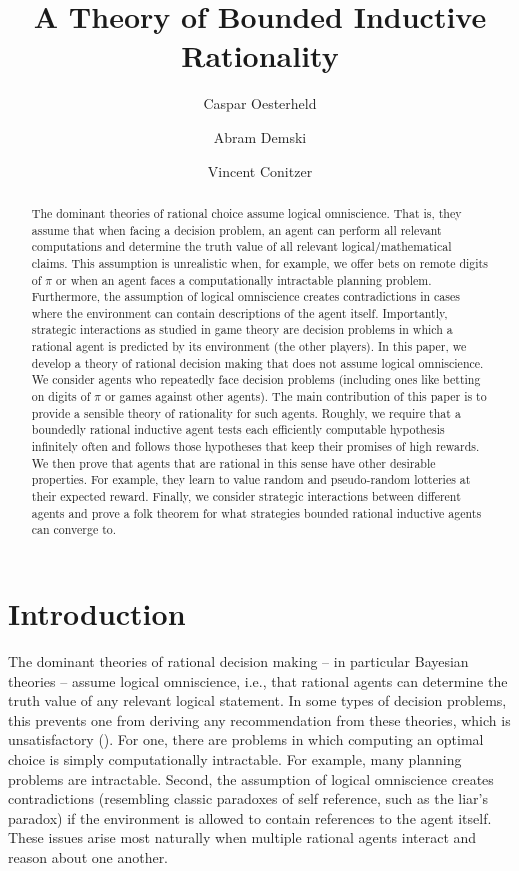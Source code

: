 \documentclass[submission,copyright,creativecommons]{eptcs}
\title{A Theory of Bounded Inductive Rationality}
\author{Caspar Oesterheld
\institute{Computer Science Department\\
Carnegie Mellon University\\
Pittsburgh, PA, USA}
\email{oesterheld@cmu.edu}
\and
Abram Demski
\institute{Machine Intelligence Research Institute\\
Berkeley, California, USA}
\and 
Vincent Conitzer
\institute{Computer Science Department\\
Carnegie Mellon University\\
Pittsburgh, PA, USA}
}
\begin{document}
\maketitle 

\begin{abstract}
The dominant theories of rational choice assume %
logical omniscience. That is, they assume that when facing a decision problem, an agent can perform all relevant computations and determine the truth value of all relevant logical/mathematical claims. This assumption is unrealistic when, for example, we offer bets on remote digits of $\pi$ or when an agent faces a computationally intractable planning problem.
Furthermore, the assumption of logical omniscience creates contradictions in cases where the environment can contain descriptions of the agent itself.
Importantly, strategic interactions as studied in game theory are decision problems in which a rational agent is predicted by its environment (the other players).
In this paper, we develop a theory of rational decision making that does not assume logical omniscience. 
We consider agents who repeatedly face decision problems (including ones like betting on digits of $\pi$ or games against other agents). The main contribution of this paper is to provide a sensible theory of rationality for such agents.
Roughly, we require that a boundedly rational inductive agent tests each efficiently computable hypothesis infinitely often and follows those hypotheses that keep their promises of high rewards. We then prove that agents that are rational in this sense have other desirable properties. For example, they learn to value random and pseudo-random lotteries at their expected reward. Finally, we consider strategic interactions between different agents and prove a folk theorem for what strategies bounded rational inductive agents can converge to.
\end{abstract}

%

\section{Introduction}
\label{sec:introduction}

The dominant theories of rational decision making -- in particular Bayesian theories -- assume logical omniscience, i.e., that rational agents can determine the truth value of any relevant logical statement. In some types of decision problems, this prevents one from deriving any recommendation from these theories, which is unsatisfactory (). For one, there are problems in which computing an optimal choice is simply computationally intractable. For example, many planning problems are intractable. Second, the assumption of logical omniscience creates contradictions (resembling classic paradoxes of self reference, such as the liar's paradox) if the environment is allowed to contain references to the agent itself. These issues arise most naturally when multiple rational agents interact and reason about one another.
\end{document}
